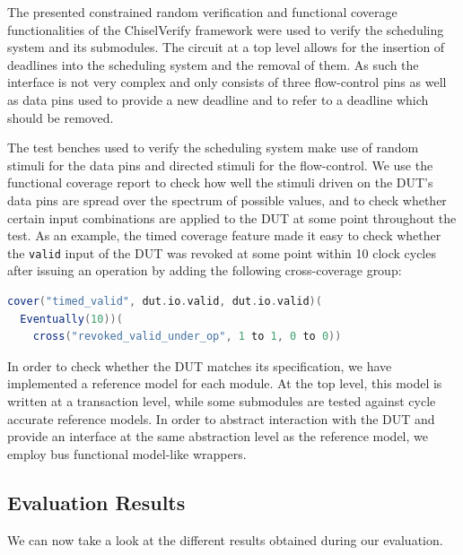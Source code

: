 \documentclass[conference]{IEEEtran}
\begin{document}
The presented constrained random verification and functional coverage functionalities of the ChiselVerify framework were used to verify the scheduling system and its submodules. 
The circuit at a top level allows for the insertion of deadlines into the scheduling system and the removal of them. As such the interface is not very complex and only consists of three flow-control pins as well as data pins used to provide a new deadline and to refer to a deadline which should be removed. 


The test benches used to verify the scheduling system make use of random stimuli for the data pins and directed stimuli for the flow-control.
We use the functional coverage report to check how well the stimuli driven on the DUT's data pins are spread over the spectrum of possible values, and to check whether certain input combinations are applied to the DUT at some point throughout the test. 
As an example, the timed coverage feature made it easy to check whether the \texttt{valid} input of the DUT was revoked at some point within 10 clock cycles after issuing an operation by adding the following cross-coverage group:

\begin{lstlisting}[language=scala, caption={A timed cover construct.}, label={lst:timedcover}]
cover("timed_valid", dut.io.valid, dut.io.valid)(
  Eventually(10))(
    cross("revoked_valid_under_op", 1 to 1, 0 to 0))
\end{lstlisting}

In order to check whether the DUT matches its specification, we have implemented a reference model for each module. 
At the top level, this model is written at a transaction level, while some submodules are tested against cycle accurate reference models.
In order to abstract interaction with the DUT and provide an interface at the same abstraction level as the reference model, we employ bus functional model-like wrappers. 

\subsection{Evaluation Results}
We can now take a look at the different results obtained during our evaluation.
\end{document}

